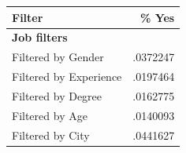\begin{tabular}{lr}


\toprule


Filter & \% Yes \\


\midrule


\multicolumn{2}{l}{\textbf{Job filters}}\\ 
\midrule
Filtered by Gender&    .0372247\\
Filtered by Experience&    .0197464\\
Filtered by Degree&    .0162775\\
Filtered by Age&    .0140093\\
Filtered by City&    .0441627\\
\bottomrule


\end{tabular}


